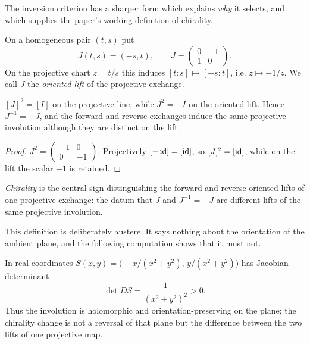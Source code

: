 The inversion criterion has a sharper form which explains \emph{why} it selects, and
which supplies the paper's working definition of chirality.

\begin{definition}\label{def:exchange-lift}
On a homogeneous pair $(t,s)$ put
\[
  J(t,s)=(-s,t),\qquad J=\begin{pmatrix}0&-1\\ 1&0\end{pmatrix}.
\]
On the projective chart $z=t/s$ this induces $[t:s]\mapsto[-s:t]$, i.e.
$z\mapsto-1/z$.  We call $J$ the \emph{oriented lift} of the projective exchange.
\end{definition}

\begin{proposition}\label{prop:order-two-four}
$[J]^{2}=[I]$ on the projective line, while $J^{2}=-I$ on the oriented lift.  Hence
$J^{-1}=-J$, and the forward and reverse exchanges induce the same projective
involution although they are distinct on the lift.
\end{proposition}

\begin{proof}
$J^{2}=\begin{pmatrix}-1&0\\0&-1\end{pmatrix}$.  Projectively $[-\operatorname{id}]=[\operatorname{id}]$, so
$[J]^{2}=[\operatorname{id}]$, while on the lift the scalar $-1$ is retained.
\end{proof}

\begin{definition}[Chirality]\label{def:chirality}
\emph{Chirality} is the central sign distinguishing the forward and reverse oriented
lifts of one projective exchange: the datum that $J$ and $J^{-1}=-J$ are different
lifts of the same projective involution.
\end{definition}

This definition is deliberately austere.  It says nothing about the orientation of the
ambient plane, and the following computation shows that it must not.

\begin{proposition}\label{prop:not-orientation}
In real coordinates $S(x,y)=\bigl(-x/(x^{2}+y^{2}),\,y/(x^{2}+y^{2})\bigr)$ has
Jacobian determinant
\[
  \det DS=\frac{1}{(x^{2}+y^{2})^{2}}>0 .
\]
Thus the involution is holomorphic and orientation-preserving on the plane; the
chirality change is not a reversal of that plane but the difference between the two
lifts of one projective map.
\end{proposition}

